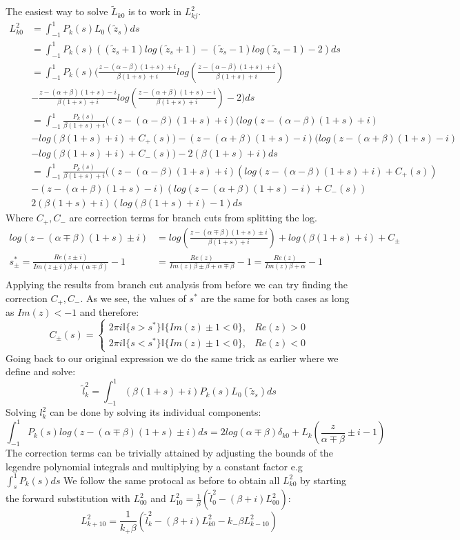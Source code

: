 \documentclass{article}
\begin{document}
The easiest way to solve $\tilde L_{k0}$ is to work in $L_{kj}^2$.
\begin{align}
    L_{k0}^2 &= \int_{-1}^1P_k(s)L_0(\tilde z_s)ds\\
    &= \int_{-1}^1P_k(s)((\tilde z_s+1)log(\tilde z_s+1)-(\tilde z_s-1)log(\tilde z_s-1)-2)ds\\
    &= \int_{-1}^1P_k(s)(\frac{z-(\alpha-\beta)(1+s)+i}{\beta(1+s)+i}log(\frac{z-(\alpha-\beta)(1+s)+i}{\beta(1+s)+i})\\
    &-\frac{z-(\alpha+\beta)(1+s)-i}{\beta(1+s)+i}log(\frac{z-(\alpha+\beta)(1+s)-i}{\beta(1+s)+i})-2)ds\\
    &=\int_{-1}^1\frac{P_k(s)}{\beta(1+s)+i}((z-(\alpha-\beta)(1+s)+i)(log(z-(\alpha-\beta)(1+s)+i)\\
    &-log(\beta(1+s)+i)+C_+(s))-(z-(\alpha+\beta)(1+s)-i)(log(z-(\alpha+\beta)(1+s)-i)\\
    &-log(\beta(1+s)+i)+C_-(s))-2(\beta(1+s)+i)ds\\
    &=\int_{-1}^1\frac{P_k(s)}{\beta(1+s)+i}((z-(\alpha-\beta)(1+s)+i)(log(z-(\alpha-\beta)(1+s)+i)+C_+(s))\\
    &-(z-(\alpha+\beta)(1+s)-i)(log(z-(\alpha+\beta)(1+s)-i)+C_-(s))\\
    &2(\beta(1+s)+i)(log(\beta(1+s)+i)-1)ds
\end{align}
Where $C_+, C_-$ are correction terms for branch cuts from splitting the log.
\begin{align}
    log(z-(\alpha\mp\beta)(1+s)\pm i)&=log(\frac{z-(\alpha\mp\beta)(1+s)\pm i}{\beta(1+s)+i})+log(\beta(1+s)+i)+C_\pm\\
    s_\pm^*= \frac{Re(z\pm i)}{Im(z\pm i)\beta+(\alpha\mp\beta)}-1&=\frac{Re(z)}{Im(z)\beta\pm\beta+\alpha\mp\beta}-1=\frac{Re(z)}{Im(z)\beta+\alpha}-1\\
\end{align}
Applying the results from branch cut analysis from before we can try finding the correction $C_+,C_-$.
As we see, the values of $s^*$ are the same for both cases as long as $Im(z)<-1$ and therefore:
$$C_\pm(s)=\begin{cases}
    2\pi i\mathbb{I}\{s>s^*\}\mathbb{I}\{Im(z)\pm1<0\},&Re(z)>0\\
    2\pi i\mathbb{I}\{s<s^*\}\mathbb{I}\{Im(z)\pm1<0\},&Re(z)<0
\end{cases}$$
Going back to our original expression we do the same trick as earlier where we define and solve:
$$\tilde l_k^2=\int_{-1}^1(\beta(1+s)+i)P_k(s)L_0(\tilde z_s)ds$$
Solving $l_k^2$ can be done by solving its individual components:
$$\int_{-1}^1P_k(s)log(z-(\alpha\mp\beta)(1+s)\pm i)ds=2log(\alpha\mp\beta)\delta_{k0}
+L_k(\frac{z}{\alpha\mp\beta}\pm i-1)$$
The correction terms can be trivially attained by adjusting the bounds of the legendre polynomial integrals and multiplying by a constant factor e.g $\int_s^1P_k(s)ds$
We follow the same protocal as before to obtain all $L_{k0}^2$ by starting the forward substitution with $L_{00}^2$ and $L_{10}^2=\frac{1}{\beta}(\tilde l_0^2-(\beta+i)L_{00}^2)$:
$$L_{k+10}^2=\frac{1}{k_+\beta}(\tilde l_k^2-(\beta+i)L_{k0}^2-k_-\beta L_{k-10}^2)$$
\end{document}
